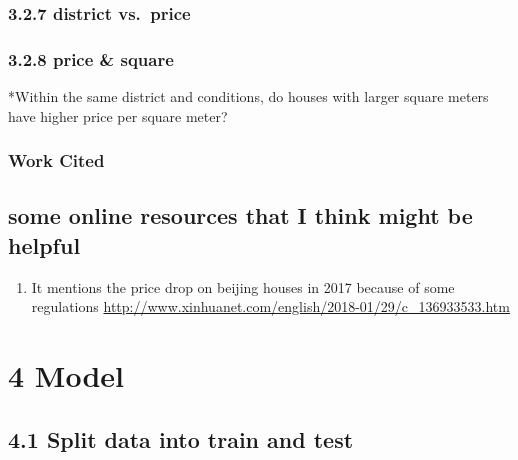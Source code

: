 \documentclass[
]{article}
\providecommand{\tightlist}{%
  \setlength{\itemsep}{0pt}\setlength{\parskip}{0pt}}
\begin{document}
\hypertarget{district-vs.-price}{%
\subsubsection{3.2.7 district vs.~price}\label{district-vs.-price}}

\hypertarget{price-square}{%
\subsubsection{3.2.8 price \& square}\label{price-square}}

*Within the same district and conditions, do houses with larger square
meters have higher price per square meter?

\hypertarget{work-cited}{%
\subsubsection{\texorpdfstring{\textbf{Work
Cited}}{Work Cited}}\label{work-cited}}

\hypertarget{some-online-resources-that-i-think-might-be-helpful}{%
\subsection{some online resources that I think might be
helpful}\label{some-online-resources-that-i-think-might-be-helpful}}

\begin{enumerate}
\def\labelenumi{\arabic{enumi}.}
\tightlist
\item
  It mentions the price drop on beijing houses in 2017 because of some
  regulations
  \url{http://www.xinhuanet.com/english/2018-01/29/c_136933533.htm}
\end{enumerate}

\hypertarget{model}{%
\section{4 Model}\label{model}}

\hypertarget{split-data-into-train-and-test}{%
\subsection{4.1 Split data into train and
test}\label{split-data-into-train-and-test}}
\end{document}
